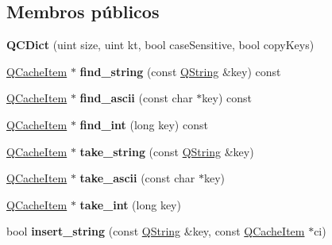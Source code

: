 \subsection*{Membros públicos}
\begin{DoxyCompactItemize}
\item 
\hypertarget{class_q_c_dict_a330f6beaf296791d3a95130cb366d4c9}{{\bfseries Q\-C\-Dict} (uint size, uint kt, bool case\-Sensitive, bool copy\-Keys)}\label{class_q_c_dict_a330f6beaf296791d3a95130cb366d4c9}

\item 
\hypertarget{class_q_c_dict_a723edfbbb7b183e8552bb89b65078737}{\hyperlink{struct_q_cache_item}{Q\-Cache\-Item} $\ast$ {\bfseries find\-\_\-string} (const \hyperlink{class_q_string}{Q\-String} \&key) const }\label{class_q_c_dict_a723edfbbb7b183e8552bb89b65078737}

\item 
\hypertarget{class_q_c_dict_a567182494623d1609026011995776a3f}{\hyperlink{struct_q_cache_item}{Q\-Cache\-Item} $\ast$ {\bfseries find\-\_\-ascii} (const char $\ast$key) const }\label{class_q_c_dict_a567182494623d1609026011995776a3f}

\item 
\hypertarget{class_q_c_dict_a4397630e43d8878b144baddee17e808e}{\hyperlink{struct_q_cache_item}{Q\-Cache\-Item} $\ast$ {\bfseries find\-\_\-int} (long key) const }\label{class_q_c_dict_a4397630e43d8878b144baddee17e808e}

\item 
\hypertarget{class_q_c_dict_aacacbf315534fcb023c5edd6954f4408}{\hyperlink{struct_q_cache_item}{Q\-Cache\-Item} $\ast$ {\bfseries take\-\_\-string} (const \hyperlink{class_q_string}{Q\-String} \&key)}\label{class_q_c_dict_aacacbf315534fcb023c5edd6954f4408}

\item 
\hypertarget{class_q_c_dict_a7807a855dc06f6fa6d78b72ffec17232}{\hyperlink{struct_q_cache_item}{Q\-Cache\-Item} $\ast$ {\bfseries take\-\_\-ascii} (const char $\ast$key)}\label{class_q_c_dict_a7807a855dc06f6fa6d78b72ffec17232}

\item 
\hypertarget{class_q_c_dict_ab4b2635688f8e42df95f8f5cd1e7040e}{\hyperlink{struct_q_cache_item}{Q\-Cache\-Item} $\ast$ {\bfseries take\-\_\-int} (long key)}\label{class_q_c_dict_ab4b2635688f8e42df95f8f5cd1e7040e}

\item 
\hypertarget{class_q_c_dict_afa0acfe5d782e09dcf9a43e9d2afb090}{bool {\bfseries insert\-\_\-string} (const \hyperlink{class_q_string}{Q\-String} \&key, const \hyperlink{struct_q_cache_item}{Q\-Cache\-Item} $\ast$ci)}\label{class_q_c_dict_afa0acfe5d782e09dcf9a43e9d2afb090}


\end{DoxyCompactItemize}
